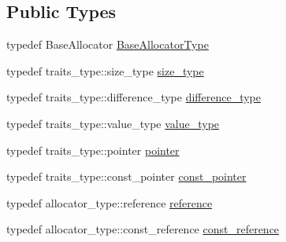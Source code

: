 \subsection*{Public Types}
\begin{DoxyCompactItemize}
\item 
typedef Base\+Allocator \hyperlink{classStdAllocator_a09e7299a6c14e2d234bd469f1162bb21}{Base\+Allocator\+Type}
\item 
typedef traits\+\_\+type\+::size\+\_\+type \hyperlink{classStdAllocator_af0b177dc293fe5b985ba9e27de23b2c1}{size\+\_\+type}
\item 
typedef traits\+\_\+type\+::difference\+\_\+type \hyperlink{classStdAllocator_a4f3adbac47a8c20e47dbfb5c1f421ccd}{difference\+\_\+type}
\item 
typedef traits\+\_\+type\+::value\+\_\+type \hyperlink{classStdAllocator_aa9b7be996e5529bd6f1cbacadfa090c7}{value\+\_\+type}
\item 
typedef traits\+\_\+type\+::pointer \hyperlink{classStdAllocator_a0c970fb2525af736640f0ac3a29d45c5}{pointer}
\item 
typedef traits\+\_\+type\+::const\+\_\+pointer \hyperlink{classStdAllocator_add1391b3b872c9be9b4d89ed4fabe296}{const\+\_\+pointer}
\item 
typedef allocator\+\_\+type\+::reference \hyperlink{classStdAllocator_a108581b842584639473a6d3fdd135598}{reference}
\item 
typedef allocator\+\_\+type\+::const\+\_\+reference \hyperlink{classStdAllocator_a2bc4a28386765e3a2c105b270793a49e}{const\+\_\+reference}
\end{DoxyCompactItemize}

